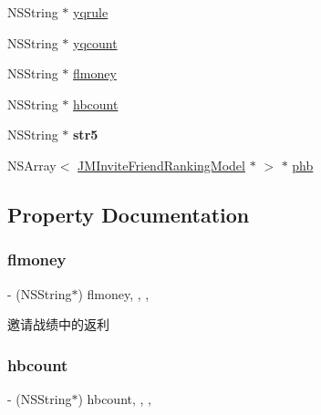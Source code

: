 \begin{DoxyCompactItemize}
N\+S\+String $\ast$ \mbox{\hyperlink{interface_j_m_invite_friend_model_a083ab94d9ed7c899daa56c459584f0be}{yqrule}}
\item 
N\+S\+String $\ast$ \mbox{\hyperlink{interface_j_m_invite_friend_model_af970375bb685eb0167d15a165092c113}{yqcount}}
\item 
N\+S\+String $\ast$ \mbox{\hyperlink{interface_j_m_invite_friend_model_a373fd6a0859990980cdeb7d978eabca1}{flmoney}}
\item 
N\+S\+String $\ast$ \mbox{\hyperlink{interface_j_m_invite_friend_model_a3c0a45f9be2c8c47483dbf3dbdc4f6d4}{hbcount}}
\item 
\mbox{\label{interface_j_m_invite_friend_model_add439f52cd15561e30ffdd96e5758510}} 
N\+S\+String $\ast$ {\bfseries str5}
\item 
N\+S\+Array$<$ \mbox{\hyperlink{interface_j_m_invite_friend_ranking_model}{J\+M\+Invite\+Friend\+Ranking\+Model}} $\ast$ $>$ $\ast$ \mbox{\hyperlink{interface_j_m_invite_friend_model_a196bc79134bc3be93437f798a0ccb47d}{phb}}
\end{DoxyCompactItemize}


\subsection{Property Documentation}
\mbox{\label{interface_j_m_invite_friend_model_a373fd6a0859990980cdeb7d978eabca1}} 
\subsubsection{\texorpdfstring{flmoney}{flmoney}}
{\footnotesize\ttfamily -\/ (N\+S\+String$\ast$) flmoney\hspace{0.3cm}{\ttfamily [read]}, {\ttfamily [write]}, {\ttfamily [nonatomic]}, {\ttfamily [copy]}}

邀请战绩中的返利 \mbox{\label{interface_j_m_invite_friend_model_a3c0a45f9be2c8c47483dbf3dbdc4f6d4}} 
\subsubsection{\texorpdfstring{hbcount}{hbcount}}
{\footnotesize\ttfamily -\/ (N\+S\+String$\ast$) hbcount\hspace{0.3cm}{\ttfamily [read]}, {\ttfamily [write]}, {\ttfamily [nonatomic]}, {\ttfamily [copy]}}

